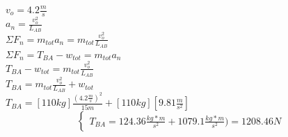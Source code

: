\documentclass[a4paper,11pt]{scrartcl}
\begin{document}
\begin{center}
$v_o = 4.2 \frac{m}{s}$\\
\hfill \break
$a_n = \frac{v_o^2}{L_{AB}}$\\
\hfill \break
$\Sigma F_n = m_{tot} a_n = m_{tot} \frac{v_o^2}{L_{AB}}$\\
\hfill \break
$\Sigma F_n = T_{BA} - w_{tot} = m_{tot} a_n$\\
\hfill \break
$T_{BA} - w_{tot} = m_{tot} \frac{v_o^2}{L_{AB}}$\\
\hfill \break
$T_{BA} = m_{tot} \frac{v_o^2}{L_{AB}} + w_{tot}$\\
\hfill \break
$T_{BA} = [110 kg] \frac{(4.2 \frac{m}{s})^2}{15 m} + [110 kg][9.81 \frac{m}{s^2}]$\\

\begin{equation}
  \left\lbrace
  \begin{array}{l}
    T_{BA} = 124.36 \frac{kg*m}{s^2} + 1079.1 \frac{kg*m}{s^2}) = 1208.46 N
  \end{array}
  \right.
\end{equation}

\end{center}
\end{document}
